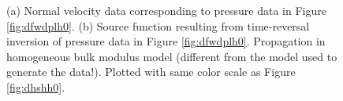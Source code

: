 \documentclass[12pt]{geophysics}
\begin{document}
\begin{figure}
  \centering
  \caption{(a) Normal velocity data corresponding to pressure data in
    Figure \ref{fig:dfwdplh0}. (b) Source function resulting from time-reversal inversion
    of pressure data in Figure \ref{fig:dfwdplh0}. Propagation in homogeneous
    bulk modulus model (different from the model used to generate the
    data!). Plotted with same color scale as Figure \ref{fig:dhshh0}.}
\end{figure}
\end{document}

